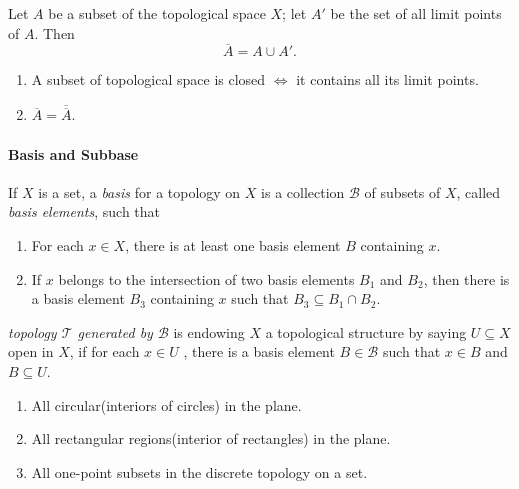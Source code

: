 \begin{theorem}
  Let \( A \) be a subset of the topological space \( X \);
  let \( A' \) be the set of all limit points of \( A \).
  Then
  \[
    \overline{A} = A \cup A'.
  \]
\end{theorem}

\begin{corollary}
  \begin{enumerate}
    \item A subset of topological space is closed \( \iff \) it contains all its
      limit points.
    \item \( \overline{A} = \overline{\overline{A}} \).
  \end{enumerate}
\end{corollary}

\paragraph{Basis and Subbase}

\begin{definition}
  If \( X \) is a set, a \emph{basis} for a topology on \( X \) is a collection
  \( \mathcal{B} \) of subsets of \( X \), called \emph{basis elements}, such
  that
  \begin{enumerate}
    \item For each \( x \in X \), there is at least one basis element \( B \)
      containing \( x \).
    \item If \( x \) belongs to the intersection of two basis elements \( B_1 \)
      and \( B_2 \), then there is a basis element \( B_3 \) containing \( x \)
      such that \( B_3 \subseteq B_1 \cap B_2 \).
  \end{enumerate}
  \emph{topology \( \mathcal{T} \) generated by \( \mathcal{B} \)} is endowing
  \( X \) a topological structure by saying \( U \subseteq X \)  open in \( X
  \), if for each \( x \in U \) , there is a basis element \( B \in \mathcal{B}
  \) such that \( x \in B \) and \( B \subseteq U \).
\end{definition}

\begin{example}
  \begin{enumerate}
    \item All circular(interiors of circles) in the plane.
    \item All rectangular regions(interior of rectangles) in the plane.
    \item All one-point subsets in the discrete topology on a set.
  \end{enumerate}
\end{example}

